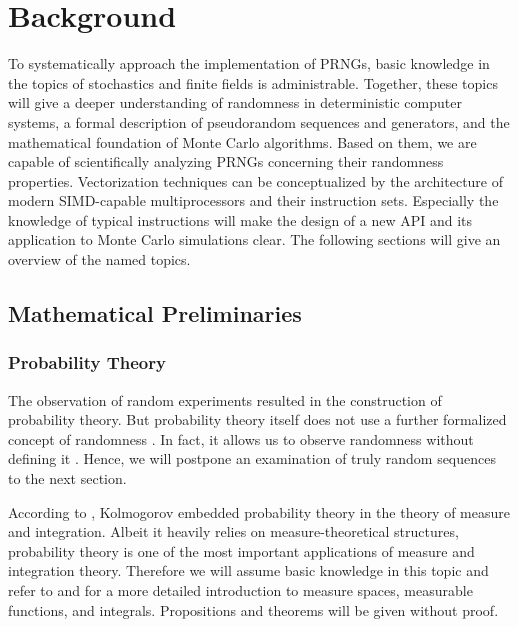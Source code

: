 \documentclass{stdlocal}
\begin{document}
\section{Background} %
\label{sec:background}
  To systematically approach the implementation of PRNGs, basic knowledge in the topics of stochastics and finite fields is administrable.
  Together, these topics will give a deeper understanding of randomness in deterministic computer systems, a formal description of pseudorandom sequences and generators, and the mathematical foundation of Monte Carlo algorithms.
  Based on them, we are capable of scientifically analyzing PRNGs concerning their randomness properties.
  Vectorization techniques can be conceptualized by the architecture of modern SIMD-capable multiprocessors and their instruction sets.
  Especially the knowledge of typical instructions will make the design of a new API and its application to Monte Carlo simulations clear.
  The following sections will give an overview of the named topics.

  \subsection{Mathematical Preliminaries} %
  \label{sub:mathematical_preliminaries}
    \subsubsection*{Probability Theory} %
    \label{ssub:stochastics}
      The observation of random experiments resulted in the construction of probability theory.
      But probability theory itself does not use a further formalized concept of randomness \autocite{schmidt2009}.
      In fact, it allows us to observe randomness without defining it \autocite{volchan2002}.
      Hence, we will postpone an examination of truly random sequences to the next section.

      According to \textcite{schmidt2009}, Kolmogorov embedded probability theory in the theory of measure and integration.
      Albeit it heavily relies on measure-theoretical structures, probability theory is one of the most important applications of measure and integration theory.
      Therefore we will assume basic knowledge in this topic and refer to \textcite{schmidt2009} and \textcite{elstrodt2011} for a more detailed introduction to measure spaces, measurable functions, and integrals.
      Propositions and theorems will be given without proof.
\end{document}
